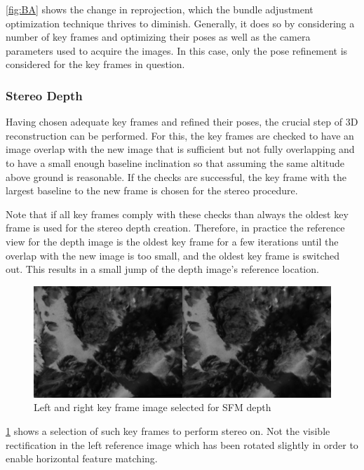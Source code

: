 \cref{fig:BA} shows the change in reprojection, which the bundle adjustment optimization technique thrives to diminish. Generally, it does so by considering a number of key frames and optimizing their poses as well as the camera parameters used to acquire the images. In this case, only the pose refinement is considered for the key frames in question.

\subsubsection{Stereo Depth}\label{subsubsec:SFM_stereo}

Having chosen adequate key frames and refined their poses, the crucial step of 3D reconstruction can be performed. For this, the key frames are checked to have an image overlap with the new image that is sufficient but not fully overlapping and to have a small enough baseline inclination so that assuming the same altitude above ground is reasonable. If the checks are successful, the key frame with the largest baseline to the new frame is chosen for the stereo procedure. 

Note that if all key frames comply with these checks than always the oldest key frame is used for the stereo depth creation. Therefore, in practice the reference view for the depth image is the oldest key frame for a few iterations until the overlap with the new image is too small, and the oldest key frame is switched out. This results in a small jump of the depth image's reference location. 

\begin{figure}[h]
\centering
\includegraphics[scale=0.28]{images/system_overview/sfm_images.png}
\caption{Left and right key frame image selected for SFM depth}
\label{fig:sfm_images}
\end{figure}

\cref{fig:sfm_images} shows a selection of such key frames to perform stereo on. Not the visible rectification in the left reference image which has been rotated slightly in order to enable horizontal feature matching.

